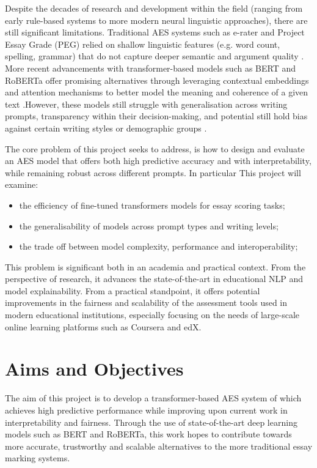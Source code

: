 \documentclass[8pt]{report}
\begin{document}
Despite the decades of research and development within the field (ranging from early rule-based systems to more modern neural linguistic approaches), there are still significant limitations. 
Traditional AES systems such as e-rater \parencite{e-rater2006} and Project Essay Grade (PEG) \parencite{page2003} relied on shallow linguistic features (e.g. word count, spelling, grammar) 
that do not capture deeper semantic and argument quality \parencite{dikli2006}. More recent advancements with transformer-based models such as BERT \parencite{devlin2019bert} and RoBERTa 
\parencite{liu2019roberta} offer promising alternatives through leveraging contextual embeddings and attention mechanisms to better model the meaning and coherence of a given text \parencite{devlin2019bert}.However, 
these models still struggle with generalisation across writing prompts, transparency within their decision-making, and potential still hold bias against certain writing styles or demographic groups \cite{beigman2021limitations}.

The core problem of this project seeks to address, is how to design and evaluate an AES model that offers both high predictive accuracy and with interpretability, while remaining robust across different prompts. In particular 
This project will examine:
\begin{itemize}
    \item the efficiency of fine-tuned transformers models for essay scoring tasks;
    \item the generalisability of models across prompt types and writing levels;
    \item the trade off between model complexity, performance and interoperability;
\end{itemize}

This problem is significant both in an academia and practical context. From the perspective of research, it advances the state-of-the-art in educational NLP and model explainability. From a practical standpoint, it offers 
potential improvements in the fairness and scalability of the assessment tools used in modern educational institutions, especially focusing on the needs of large-scale online learning platforms such as Coursera and edX.


\section{Aims and Objectives}
The aim of this project is to develop a transformer-based AES system of which achieves high predictive performance while improving upon current work in interpretability and fairness. Through the use of state-of-the-art
deep learning models such as BERT and RoBERTa, this work hopes to contribute towards more accurate, trustworthy and scalable alternatives to the more traditional essay marking systems.
\end{document}
